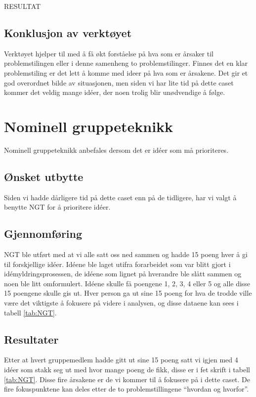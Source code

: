 RESULTAT

\subsection{Konklusjon av verktøyet}
Verktøyet hjelper til med å få økt forståelse på hva som er årsaker til problemstilingen eller i denne samenheng to problemstilinger. Finnes det en klar problemstiling er det lett å komme med ideer på hva som er årsakene. Det gir et god overordnet bilde av situasjonen, men siden vi har lite tid på dette caset kommer det veldig mange idéer, der noen trolig blir unødvendige å følge.



\section{Nominell gruppeteknikk}
Nominell gruppeteknikk anbefales dersom det er idéer som må prioriteres. 

\subsection{Ønsket utbytte}
Siden vi hadde dårligere tid på dette caset enn på de tidligere, har vi valgt å benytte NGT for å prioritere idéer.

\subsection{Gjennomføring}
NGT ble utført med at vi alle satt oss ned sammen og hadde 15 poeng hver å gi til forskjellige idéer. Idéene ble laget utifra forarbeidet som var blitt gjort i idémyldringsprosessen, de idéene som lignet på hverandre ble slått sammen og noen ble litt omformulert. Idéene skulle få poengene 1, 2, 3, 4 eller 5 og alle disse 15 poengene skulle gis ut. Hver person ga ut sine 15 poeng for hva de trodde ville være det viktigste å fokusere på videre i analysen, og disse dataene kan sees i tabell \ref{tab:NGT}.

\subsection{Resultater}
Etter at hvert gruppemedlem hadde gitt ut sine 15 poeng satt vi igjen med 4 idéer som stakk seg ut med hvor mange poeng de fikk, disse er i fet skrift i tabell \ref{tab:NGT}. Disse fire årsakene er de vi kommer til å fokusere på i dette caset. De fire fokuspunktene kan deles etter de to problemstillingene ``hvordan og hvorfor''.


